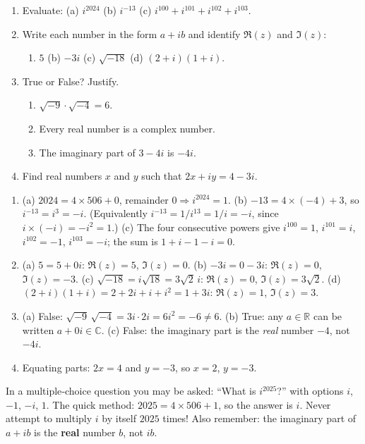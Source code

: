 \documentclass[11pt]{article}
\begin{document}
\begin{exercice}
\begin{enumerate}
\item Evaluate: (a) $i^{2024}$ \quad (b) $i^{-13}$ \quad (c) $i^{100}+i^{101}+i^{102}+i^{103}$.
\item Write each number in the form $a+ib$ and identify $\Re(z)$ and $\Im(z)$:
\begin{enumerate}
\item $5$ \quad (b) $-3i$ \quad (c) $\sqrt{-18}$ \quad (d) $(2+i)(1+i)$.
\end{enumerate}
\item True or False? Justify.
\begin{enumerate}
\item $\sqrt{-9}\cdot\sqrt{-4}=6$.
\item Every real number is a complex number.
\item The imaginary part of $3-4i$ is $-4i$.
\end{enumerate}
\item Find real numbers $x$ and $y$ such that $2x+iy=4-3i$.
\end{enumerate}
\end{exercice}

\begin{corrige}[Exercise 1]
\begin{enumerate}
\item (a) $2024=4\times506+0$, remainder $0 \Rightarrow i^{2024}=1$.
(b) $-13 = 4\times(-4)+3$, so $i^{-13}=i^{3}=-i$. (Equivalently $i^{-13}=1/i^{13}=1/i=-i$, since $i\times(-i)=-i^{2}=1$.)
(c) The four consecutive powers give $i^{100}=1$, $i^{101}=i$, $i^{102}=-1$, $i^{103}=-i$; the sum is $1+i-1-i=0$.
\item (a) $5=5+0i$: $\Re(z)=5$, $\Im(z)=0$.
(b) $-3i=0-3i$: $\Re(z)=0$, $\Im(z)=-3$.
(c) $\sqrt{-18}=i\sqrt{18}=3\sqrt{2}\,i$: $\Re(z)=0$, $\Im(z)=3\sqrt{2}$.
(d) $(2+i)(1+i)=2+2i+i+i^{2}=1+3i$: $\Re(z)=1$, $\Im(z)=3$.
\item (a) False: $\sqrt{-9}\,\sqrt{-4}=3i\cdot 2i=6i^{2}=-6\neq 6$.
(b) True: any $a\in\mathbb{R}$ can be written $a+0i\in\mathbb{C}$.
(c) False: the imaginary part is the \emph{real} number $-4$, not $-4i$.
\item Equating parts: $2x=4$ and $y=-3$, so $x=2$, $y=-3$.
\end{enumerate}
\end{corrige}

\begin{attention}
In a multiple‑choice question you may be asked: ``What is $i^{2025}$?'' with options $i$, $-1$, $-i$, $1$. The quick method: $2025 = 4\times 506+1$, so the answer is $i$. Never attempt to multiply $i$ by itself $2025$ times! Also remember: the imaginary part of $a+ib$ is the \textbf{real} number $b$, not $ib$.
\end{attention}
\end{document}
